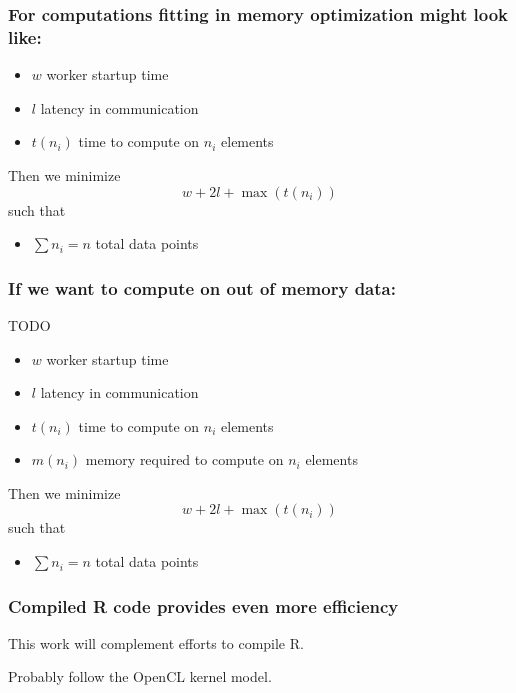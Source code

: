 \documentclass{beamer}
\begin{document}
\begin{frame}

    \frametitle{For computations fitting in memory optimization might look like:}

\begin{itemize}
    \item $w$ worker startup time
    \item $l$ latency in communication
    \item $t(n_i)$ time to compute on $n_i$ elements
\end{itemize}

Then we minimize
\[
    w + 2l + \max (t(n_i))
\]
such that 

\begin{itemize}
    \item $\sum n_i = n$ total data points
\end{itemize}

\end{frame}
\begin{frame}

    \frametitle{If we want to compute on out of memory data:}

    TODO


\begin{itemize}
    \item $w$ worker startup time
    \item $l$ latency in communication
    \item $t(n_i)$ time to compute on $n_i$ elements
    \item $m(n_i)$ memory required to compute on $n_i$ elements
\end{itemize}

Then we minimize
\[
    w + 2l + \max (t(n_i))
\]
such that 

\begin{itemize}
    \item $\sum n_i = n$ total data points
\end{itemize}


\end{frame}
\begin{frame}

    \frametitle{Compiled R code provides even more efficiency}

    This work will complement efforts to compile R.

Probably follow the OpenCL kernel model.

\end{frame}
\end{document}
